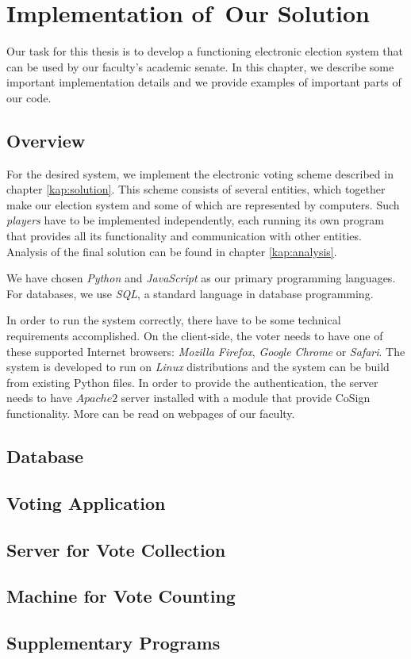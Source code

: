\chapter{Implementation of~Our Solution}
\label{kap:implementation}
Our task for this thesis is to develop a functioning electronic election system that can be used by our faculty's academic senate. In this chapter, we describe some important implementation details and we provide examples of important parts of our code.

\section{Overview}
For the desired system, we implement the electronic voting scheme described in chapter \ref{kap:solution}. This scheme consists of several entities, which together make our election system and some of which are represented by computers. Such \emph{players} have to be implemented independently, each running its own program that provides all its functionality and communication with other entities. Analysis of the final solution can be found in chapter \ref{kap:analysis}.

We have chosen \emph{Python} and \emph{JavaScript} as our primary programming languages. For databases, we use \emph{SQL}, a standard language in database programming.

In order to run the system correctly, there have to be some technical requirements accomplished. On the client-side, the voter needs to have one of these supported Internet browsers: \emph{Mozilla Firefox}, \emph{Google Chrome} or \emph{Safari}. The system is developed to run on \emph{Linux} distributions and the system can be build from existing Python files. In order to provide the authentication, the server needs to have $Apache 2$ server installed with a module that provide CoSign functionality. More can be read on webpages of our faculty.
\section{Database}
\section{Voting Application}
\section{Server for Vote Collection}
\section{Machine for Vote Counting}
\section{Supplementary Programs}